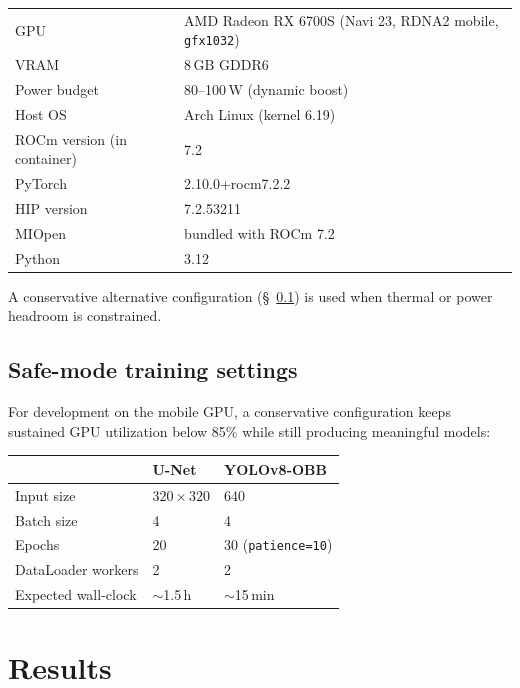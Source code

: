 \documentclass[11pt,a4paper]{article}
\begin{document}
\begin{tabular}{ll}
\toprule
GPU                  & AMD Radeon RX 6700S (Navi 23, RDNA2 mobile, \texttt{gfx1032}) \\
VRAM                 & 8\,GB GDDR6 \\
Power budget         & 80--100\,W (dynamic boost) \\
Host OS              & Arch Linux (kernel 6.19) \\
ROCm version (in container) & 7.2 \\
PyTorch              & 2.10.0+rocm7.2.2 \\
HIP version          & 7.2.53211 \\
MIOpen               & bundled with ROCm 7.2 \\
Python               & 3.12 \\
\bottomrule
\end{tabular}

\medskip
\noindent A conservative alternative configuration (\S~\ref{sec:safe}) is used
when thermal or power headroom is constrained.

\subsection{Safe-mode training settings}\label{sec:safe}

For development on the mobile GPU, a conservative configuration keeps sustained
GPU utilization below 85\% while still producing meaningful models:

\begin{center}\footnotesize
\begin{tabular}{lll}
\toprule
                 & \textbf{U-Net}               & \textbf{YOLOv8-OBB} \\
\midrule
Input size       & $320\times320$               & 640 \\
Batch size       & 4                            & 4 \\
Epochs           & 20                           & 30 (\texttt{patience=10}) \\
DataLoader workers & 2                           & 2 \\
Expected wall-clock & $\sim$1.5\,h              & $\sim$15\,min \\
\bottomrule
\end{tabular}
\end{center}

\section{Results}
\end{document}
